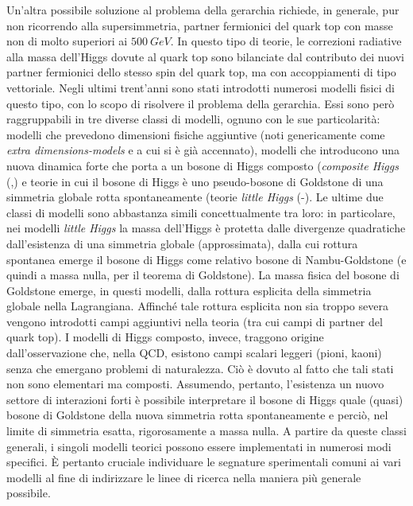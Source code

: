 \medskip
Un'altra possibile soluzione al problema della gerarchia richiede, in generale, pur non ricorrendo alla supersimmetria,  partner fermionici
del quark top con masse non di molto superiori ai $500 ~GeV$.
In questo tipo di teorie, le correzioni radiative alla massa dell'Higgs dovute al quark top sono bilanciate dal contributo dei nuovi 
partner fermionici dello stesso spin del quark top, ma con accoppiamenti di tipo vettoriale.
\newline
Negli ultimi trent'anni sono stati introdotti numerosi modelli fisici di questo tipo, con lo scopo di risolvere il problema della gerarchia.
Essi sono però raggruppabili in tre diverse classi di modelli, ognuno con le sue particolarità: modelli che prevedono dimensioni fisiche
aggiuntive (noti genericamente come \textit{extra dimensions-models} \cite{extra} e a cui si è già accennato), modelli che introducono una nuova 
dinamica forte che porta
a un bosone di Higgs composto (\textit{composite Higgs} (\cite{strong1},\cite{strong2}) e teorie in cui il bosone di Higgs 
è uno pseudo-bosone di Goldstone di una simmetria
globale rotta spontaneamente (teorie \textit{little Higgs} (\cite{little1}-\cite{little3}).
Le ultime due classi di modelli sono abbastanza simili concettualmente tra loro: in particolare, nei modelli \textit{little Higgs}
la massa dell'Higgs è protetta dalle divergenze quadratiche dall'esistenza di una simmetria globale (approssimata), 
dalla cui rottura spontanea emerge il bosone di Higgs come relativo bosone di Nambu-Goldstone (e quindi a massa nulla,
per il teorema di Goldstone). La massa fisica del bosone di Goldstone emerge, in questi modelli, dalla
rottura esplicita della simmetria globale nella Lagrangiana. Affinché tale rottura esplicita non sia troppo severa vengono
introdotti campi aggiuntivi nella teoria (tra cui campi di partner del quark top). 
\newline
I modelli di Higgs composto, invece,
traggono origine dall'osservazione che, nella QCD, esistono campi scalari leggeri (pioni, kaoni) senza che emergano problemi di naturalezza.
Ciò è dovuto al fatto che tali stati non sono elementari ma composti.
Assumendo, pertanto, l'esistenza un nuovo settore di interazioni forti è possibile interpretare il bosone di Higgs quale (quasi)
bosone di Goldstone della nuova simmetria rotta spontaneamente e perciò, nel limite di simmetria esatta, rigorosamente a massa 
nulla.
\newline
A partire da queste classi generali, i singoli modelli teorici possono essere implementati in numerosi modi specifici.
\`{E} pertanto cruciale individuare le segnature sperimentali comuni ai vari modelli al fine di indirizzare
le linee di ricerca nella maniera più generale possibile.

